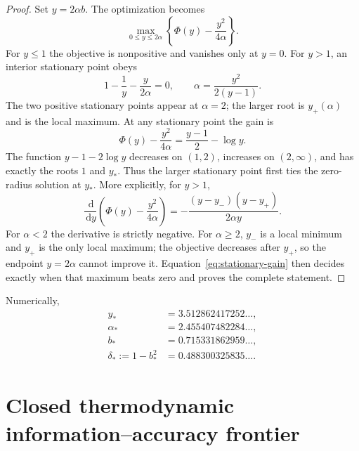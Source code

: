 \documentclass[11pt,a4paper]{article}
\theoremstyle{remark}
\newcommand{\dd}{\,\mathrm{d}}
\begin{document}
\begin{proof}
Set $y=2\alpha b$.  The optimization becomes
\begin{equation}
 \max_{0\le y\le2\alpha}
 \left\{\Phi(y)-\frac{y^2}{4\alpha}\right\}.
 \label{eq:y-optimization}
\end{equation}
For $y\le1$ the objective is nonpositive and vanishes only at $y=0$.  For
$y>1$, an interior stationary point obeys
\begin{equation}
 1-\frac1y-\frac{y}{2\alpha}=0,
 \qquad
 \alpha=\frac{y^2}{2(y-1)}.
 \label{eq:stationary}
\end{equation}
The two positive stationary points appear at $\alpha=2$; the larger root is
$y_+(\alpha)$ and is the local maximum.  At any stationary point the gain is
\begin{equation}
 \Phi(y)-\frac{y^2}{4\alpha}
 =\frac{y-1}{2}-\log y.
 \label{eq:stationary-gain}
\end{equation}
The function $y-1-2\log y$ decreases on $(1,2)$, increases on
$(2,\infty)$, and has exactly the roots $1$ and $y_*$.  Thus the larger
stationary point first ties the zero-radius solution at $y_*$.  More
explicitly, for $y>1$,
\begin{equation}
 \frac{\dd}{\dd y}\left(\Phi(y)-\frac{y^2}{4\alpha}\right)
 =-\frac{(y-y_-)(y-y_+)}{2\alpha y}.
\end{equation}
For $\alpha<2$ the derivative is strictly negative.  For $\alpha\ge2$,
$y_-$ is a local minimum and $y_+$ is the only local maximum; the objective
decreases after $y_+$, so the endpoint $y=2\alpha$ cannot improve it.
Equation~\eqref{eq:stationary-gain} then decides exactly when that maximum
beats zero and proves the complete statement.
\end{proof}

Numerically,
\begin{equation}
\begin{split}
 y_*&=3.512862417252\ldots,\\
 \alpha_*&=2.455407482284\ldots,\\
 b_*&=0.715331862959\ldots,\\
 \delta_*:=1-b_*^2&=0.488300325835\ldots .
\end{split}
\label{eq:numerical-constants}
\end{equation}

\section{Closed thermodynamic information--accuracy frontier}
\end{document}
